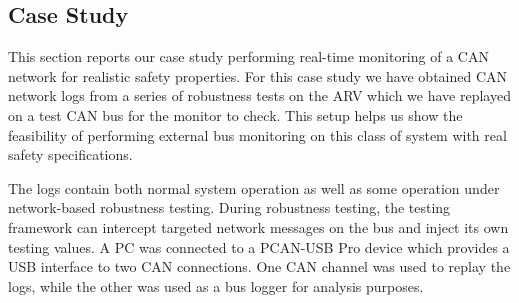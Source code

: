 \subsection{Case Study}
\label{sec:case_study}
This section reports our case study performing real-time monitoring of a CAN network for realistic safety properties.
For this case study we have obtained CAN network logs from a series of robustness tests on the ARV which we have replayed on a test CAN bus for the monitor to check.
This setup %
helps us show the feasibility of performing external bus monitoring on this class of system with real safety specifications.


The logs contain both normal system operation as well as some operation under network-based robustness testing. During robustness testing, the testing framework can intercept targeted network messages on the bus and inject its own testing values. %
A PC was connected to a PCAN-USB Pro \cite{PCAN-USBPro} device which provides a USB interface to two CAN connections. One CAN channel was used to replay the logs, while the other was used as a bus logger for analysis purposes.


